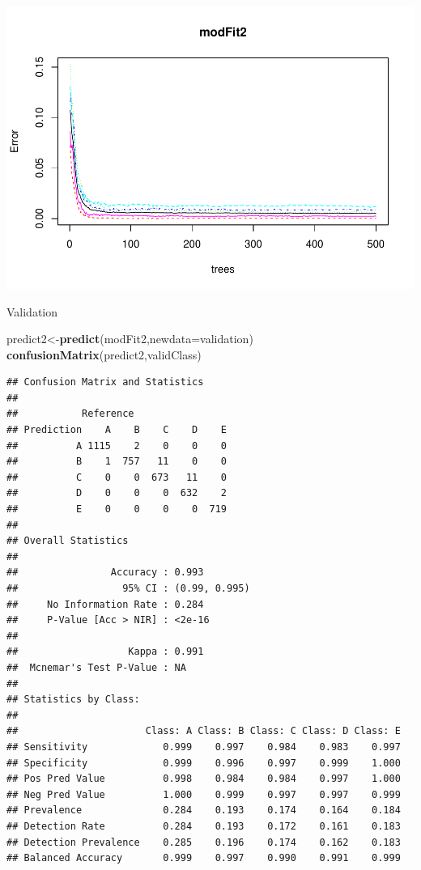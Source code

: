 \documentclass[]{article}
\newenvironment{Shaded}{\begin{snugshade}}{\end{snugshade}}
\newcommand{\KeywordTok}[1]{\textcolor[rgb]{0.13,0.29,0.53}{\textbf{{#1}}}}
\newcommand{\DataTypeTok}[1]{\textcolor[rgb]{0.13,0.29,0.53}{{#1}}}
\newcommand{\NormalTok}[1]{{#1}}
\begin{document}
\includegraphics{./PML4PDF_files/figure-latex/unnamed-chunk-12.pdf}

Validation

\begin{Shaded}
\begin{Highlighting}[]
\NormalTok{predict2<-}\KeywordTok{predict}\NormalTok{(modFit2,}\DataTypeTok{newdata=}\NormalTok{validation)}
\KeywordTok{confusionMatrix}\NormalTok{(predict2,validClass)}
\end{Highlighting}
\end{Shaded}

\begin{verbatim}
## Confusion Matrix and Statistics
## 
##           Reference
## Prediction    A    B    C    D    E
##          A 1115    2    0    0    0
##          B    1  757   11    0    0
##          C    0    0  673   11    0
##          D    0    0    0  632    2
##          E    0    0    0    0  719
## 
## Overall Statistics
##                                        
##                Accuracy : 0.993        
##                  95% CI : (0.99, 0.995)
##     No Information Rate : 0.284        
##     P-Value [Acc > NIR] : <2e-16       
##                                        
##                   Kappa : 0.991        
##  Mcnemar's Test P-Value : NA           
## 
## Statistics by Class:
## 
##                      Class: A Class: B Class: C Class: D Class: E
## Sensitivity             0.999    0.997    0.984    0.983    0.997
## Specificity             0.999    0.996    0.997    0.999    1.000
## Pos Pred Value          0.998    0.984    0.984    0.997    1.000
## Neg Pred Value          1.000    0.999    0.997    0.997    0.999
## Prevalence              0.284    0.193    0.174    0.164    0.184
## Detection Rate          0.284    0.193    0.172    0.161    0.183
## Detection Prevalence    0.285    0.196    0.174    0.162    0.183
## Balanced Accuracy       0.999    0.997    0.990    0.991    0.999
\end{verbatim}
\end{document}
